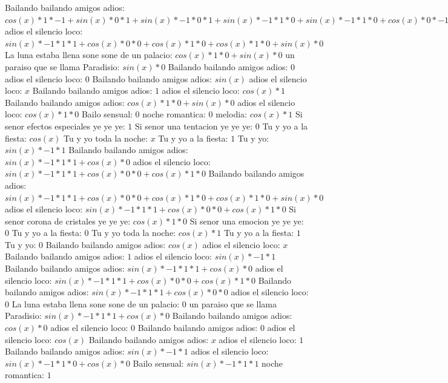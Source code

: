 \documentclass{article}
\begin{document}
Bailando bailando amigos adios: ${{{cos(x)*1*-1+sin(x)*0}*1+sin(x)*-1*0}*1+sin(x)*-1*1*0+sin(x)*-1*1*0+cos(x)*0}*-1+{sin(x)*-1*1*1+cos(x)*0}*0+{sin(x)*-1*1*1+cos(x)*0}*0+cos(x)*1*0+{sin(x)*-1*1*1+cos(x)*0}*0+cos(x)*1*0+cos(x)*1*0+sin(x)*0$  \newline adios el silencio loco: ${sin(x)*-1*1*1+cos(x)*0}*0+cos(x)*1*0+cos(x)*1*0+sin(x)*0$  \newline La luna estaba llena sone sone de un palacio: $cos(x)*1*0+sin(x)*0$  \newline un paraiso que se llama Paradisio: $sin(x)*0$ Bailando bailando amigos adios: $0$ adios el silencio loco: $0$  \newline Bailando bailando amigos adios: $sin(x)$  \newline adios el silencio loco: $x$ Bailando bailando amigos adios: $1$  \newline adios el silencio loco: $cos(x)*1$ Bailando bailando amigos adios: $cos(x)*1*0+sin(x)*0$ adios el silencio loco: $cos(x)*1*0$ Bailo sensual: $0$ noche romantica: $0$  \newline melodia: $cos(x)*1$ Si senor efectos especiales ye ye ye: $1$ Si senor una tentacion ye ye ye: $0$  \newline Tu y yo a la fiesta: $cos(x)$  \newline Tu y yo toda la noche: $x$ Tu y yo a la fiesta: $1$  \newline Tu y yo: $sin(x)*-1*1$ Bailando bailando amigos adios: $sin(x)*-1*1*1+cos(x)*0$ adios el silencio loco: ${sin(x)*-1*1*1+cos(x)*0}*0+cos(x)*1*0$ Bailando bailando amigos adios: ${sin(x)*-1*1*1+cos(x)*0}*0+cos(x)*1*0+cos(x)*1*0+sin(x)*0$ adios el silencio loco: ${sin(x)*-1*1*1+cos(x)*0}*0+cos(x)*1*0$  \newline Si senor corona de cristales ye ye ye: $cos(x)*1*0$ Si senor una emocion ye ye ye: $0$ Tu y yo a la fiesta: $0$  \newline Tu y yo toda la noche: $cos(x)*1$ Tu y yo a la fiesta: $1$ Tu y yo: $0$  \newline Bailando bailando amigos adios: $cos(x)$  \newline adios el silencio loco: $x$ Bailando bailando amigos adios: $1$  \newline adios el silencio loco: $sin(x)*-1*1$ Bailando bailando amigos adios: $sin(x)*-1*1*1+cos(x)*0$ adios el silencio loco: ${sin(x)*-1*1*1+cos(x)*0}*0+cos(x)*1*0$ Bailando bailando amigos adios: ${sin(x)*-1*1*1+cos(x)*0}*0$ adios el silencio loco: $0$ La luna estaba llena sone sone de un palacio: $0$  \newline un paraiso que se llama Paradisio: $sin(x)*-1*1*1+cos(x)*0$  \newline Bailando bailando amigos adios: $cos(x)*0$ adios el silencio loco: $0$ Bailando bailando amigos adios: $0$  \newline adios el silencio loco: $cos(x)$  \newline Bailando bailando amigos adios: $x$ adios el silencio loco: $1$  \newline Bailando bailando amigos adios: $sin(x)*-1*1$ adios el silencio loco: $sin(x)*-1*1*0+cos(x)*0$ Bailo sensual: $sin(x)*-1*1*1$ noche romantica: $1$ 
\end{document}
